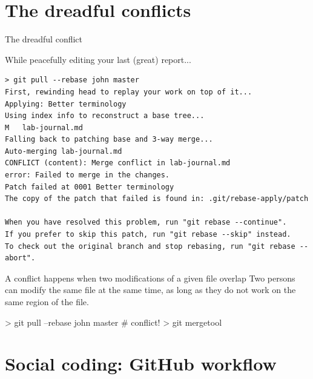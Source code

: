 \documentclass[compress]{beamer}
\begin{document}
\section[Conflicts]{The dreadful conflicts}

\begin{frame}[fragile]{The dreadful conflict}

    While peacefully editing your last (great) report...

\begin{verbatim}
> git pull --rebase john master
First, rewinding head to replay your work on top of it...
Applying: Better terminology
Using index info to reconstruct a base tree...
M	lab-journal.md
Falling back to patching base and 3-way merge...
Auto-merging lab-journal.md
CONFLICT (content): Merge conflict in lab-journal.md
error: Failed to merge in the changes.
Patch failed at 0001 Better terminology
The copy of the patch that failed is found in: .git/rebase-apply/patch

When you have resolved this problem, run "git rebase --continue".
If you prefer to skip this patch, run "git rebase --skip" instead.
To check out the original branch and stop rebasing, run "git rebase --abort".
\end{verbatim}
\end{frame}

\begin{frame}[fragile]{}

    \begin{exampleblock}{A conflict happens when two modifications of a given
    file overlap}
    Two persons can modify the same file at the same time, as
    long as they do not work on the same region of the file.
    \end{exampleblock}


\begin{shcode}
> git pull --rebase john master
# conflict!
> git mergetool
\end{shcode}
\end{frame}


\section[Going social]{Social coding: GitHub workflow}

\end{document}
